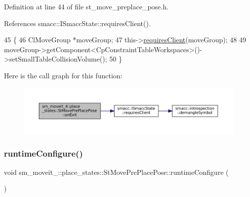 Definition at line 44 of file st\+\_\+move\+\_\+preplace\+\_\+pose.\+h.



References smacc\+::\+I\+Smacc\+State\+::requires\+Client().


\begin{DoxyCode}
45             \{
46                 ClMoveGroup *moveGroup;
47                 this->\hyperlink{classsmacc_1_1ISmaccState_a7f95c9f0a6ea2d6f18d1aec0519de4ac}{requiresClient}(moveGroup);
48 
49                 moveGroup->getComponent<CpConstraintTableWorkspaces>()->setSmallTableCollisionVolume();
50             \}
\end{DoxyCode}
Here is the call graph for this function\+:
\nopagebreak
\begin{figure}[H]
\begin{center}
\leavevmode
\includegraphics[width=350pt]{structsm__moveit__4_1_1place__states_1_1StMovePrePlacePose_a4c62c5fdaa740b27f6af5c47d3507dad_cgraph}
\end{center}
\end{figure}
\mbox{\label{structsm__moveit__4_1_1place__states_1_1StMovePrePlacePose_a76aecb88d891dab05216eff868ee4ac7}} 
\subsubsection{\texorpdfstring{runtime\+Configure()}{runtimeConfigure()}}
{\footnotesize\ttfamily void sm\+\_\+moveit\+\_\+::place\+\_\+states\+::\+St\+Move\+Pre\+Place\+Pose\+::runtime\+Configure (\begin{DoxyParamCaption}{ }\end{DoxyParamCaption})\hspace{0.3cm}{\ttfamily [inline]}}



